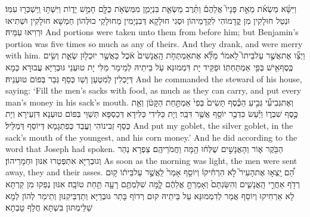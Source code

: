 {וַיִּשָּׂ֨א מַשְׂאֹ֜ת מֵאֵ֣ת פָּנָיו֮ אֲלֵהֶם֒ וַתֵּ֜רֶב מַשְׂאַ֧ת בִּנְיָמִ֛ן מִמַּשְׂאֹ֥ת כֻּלָּ֖ם חָמֵ֣שׁ יָד֑וֹת וַיִּשְׁתּ֥וּ וַֽיִּשְׁכְּר֖וּ עִמּֽוֹ׃}
{וּנְטַל חוּלָקִין מִן קֳדָמוֹהִי לִקְדָמֵיהוֹן וּסְגִי חוּלָקָא דְּבִנְיָמִין מֵחוּלָקֵי כוּלְּהוֹן חַמְשָׁא חוּלָקִין וּשְׁתִיאוּ וּרְוִיאוּ עִמֵּיהּ׃}
{And portions were taken unto them from before him; but Benjamin’s portion was five times so much as any of theirs. And they drank, and were merry with him.}{}
\newperek
{}%
{וַיְצַ֞ו אֶת\maqqaf אֲשֶׁ֣ר עַל\maqqaf בֵּיתוֹ֮ לֵאמֹר֒ מַלֵּ֞א אֶת\maqqaf אַמְתְּחֹ֤ת הָֽאֲנָשִׁים֙ אֹ֔כֶל כַּאֲשֶׁ֥ר יוּכְל֖וּן שְׂאֵ֑ת וְשִׂ֥ים כֶּֽסֶף\maqqaf אִ֖ישׁ בְּפִ֥י אַמְתַּחְתּֽוֹ׃}
{וּפַקֵּיד יָת דִּמְמוּנַּא עַל בֵּיתֵיהּ לְמֵימַר מַלִּי יָת טוּעְנֵי גּוּבְרַיָּא עֲבוּרָא כְּמָא דְּיָכְלִין לְמִטְעַן וְשַׁו כְּסַף גְּבַר בְּפוֹם טוּעְנֵיהּ׃}
{And he commanded the steward of his house, saying: ‘Fill the men’s sacks with food, as much as they can carry, and put every man’s money in his sack’s mouth.}{}
{וְאֶת\maqqaf גְּבִיעִ֞י גְּבִ֣יעַ הַכֶּ֗סֶף תָּשִׂים֙ בְּפִי֙ אַמְתַּ֣חַת הַקָּטֹ֔ן וְאֵ֖ת כֶּ֣סֶף שִׁבְר֑וֹ וַיַּ֕עַשׂ כִּדְבַ֥ר יוֹסֵ֖ף אֲשֶׁ֥ר דִּבֵּֽר׃}
{וְיָת כַּלִּידִי כַּלִּידָא דְּכַסְפָּא תְּשַׁוֵּי בְּפוֹם טוּעְנָא דִּזְעֵירָא וְיָת כְּסַף זְבִינוֹהִי וַעֲבַד כְּפִתְגָמָא דְּיוֹסֵף דְּמַלֵּיל׃}
{And put my goblet, the silver goblet, in the sack’s mouth of the youngest, and his corn money.’ And he did according to the word that Joseph had spoken.}{}
{הַבֹּ֖קֶר א֑וֹר וְהָאֲנָשִׁ֣ים שֻׁלְּח֔וּ הֵ֖מָּה וַחֲמֹרֵיהֶֽם׃}
{צַפְרָא נְהַר וְגוּבְרַיָּא אִתְפְּטַרוּ אִנּוּן וּחְמָרֵיהוֹן׃}
{As soon as the morning was light, the men were sent away, they and their asses.}{}
{הֵ֠ם יָֽצְא֣וּ אֶת\maqqaf הָעִיר֮ לֹ֣א הִרְחִ֒יקוּ֒ וְיוֹסֵ֤ף אָמַר֙ לַֽאֲשֶׁ֣ר עַל\maqqaf בֵּית֔וֹ ק֥וּם רְדֹ֖ף אַחֲרֵ֣י הָֽאֲנָשִׁ֑ים וְהִשַּׂגְתָּם֙ וְאָמַרְתָּ֣ אֲלֵהֶ֔ם לָ֛מָּה שִׁלַּמְתֶּ֥ם רָעָ֖ה תַּ֥חַת טוֹבָֽה׃}
{אִנּוּן נְפַקוּ מִן קַרְתָּא לָא אַרְחִיקוּ וְיוֹסֵף אֲמַר לְדִמְמוּנַּא עַל בֵּיתֵיהּ קוּם רְדוֹף בָּתַר גּוּבְרַיָּא וְתַדְבֵּיקִנּוּן וְתֵימַר לְהוֹן לְמָא שַׁלֵּימְתּוּן בִּשְׁתָּא חֲלָף טָבְתָא׃}
